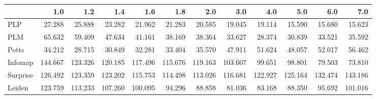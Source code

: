 \begin{tabular}{lrrrrrrrrrrr}
\toprule
{} &     1.0 &     1.2 &     1.4 &     1.6 &     1.8 &     2.0 &     3.0 &     4.0 &     5.0 &     6.0 &     7.0 \\
\midrule
PLP      &  27.288 &  25.888 &  23.282 &  21.962 &  21.283 &  20.585 &  19.045 &  19.114 &  15.590 &  15.680 &  15.623 \\
PLM      &  65.632 &  59.409 &  47.634 &  41.161 &  38.169 &  38.364 &  33.627 &  28.374 &  30.839 &  33.521 &  35.592 \\
Potts    &  34.212 &  28.715 &  30.849 &  32.281 &  33.404 &  35.570 &  47.911 &  51.624 &  48.057 &  52.017 &  56.462 \\
Infomap  & 144.667 & 123.326 & 120.185 & 117.496 & 115.676 & 119.163 & 103.607 &  99.651 &  98.801 &  79.503 &  73.810 \\
Surprise & 126.492 & 123.359 & 123.202 & 115.753 & 114.498 & 113.026 & 116.681 & 122.927 & 125.164 & 132.474 & 143.186 \\
Leiden   & 123.759 & 113.233 & 107.260 & 100.095 &  94.296 &  88.858 &  81.036 &  83.168 &  88.350 &  95.692 & 101.016 \\
\bottomrule
\end{tabular}
